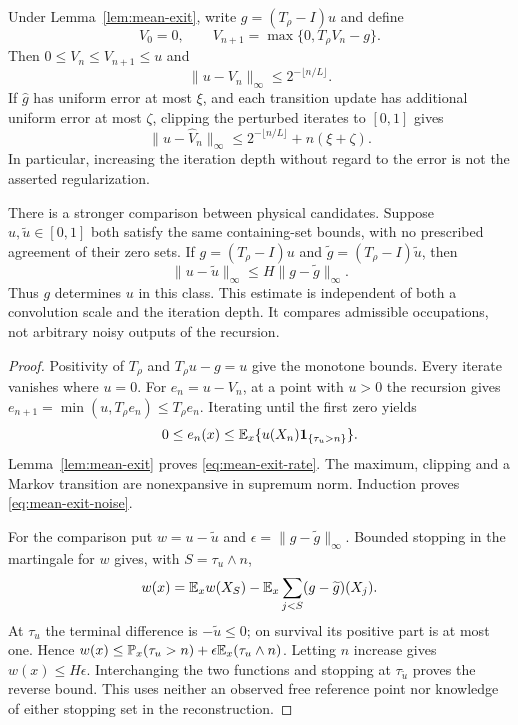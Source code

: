 \begin{theorem}
\label{thm:mean-exit-inverse}
Under Lemma~\ref{lem:mean-exit}, write $g=(T_\rho-I)u$ and define
\begin{equation}\label{eq:mean-exit-recursion}
 V_0=0,\qquad V_{n+1}=\max\{0,T_\rho V_n-g\}.
\end{equation}
Then $0\le V_n\le V_{n+1}\le u$ and
\begin{equation}\label{eq:mean-exit-rate}
 \|u-V_n\|_\infty\le2^{-\lfloor n/L\rfloor}.
\end{equation}
If $\widehat g$ has uniform error at most $\xi$, and each transition
update has additional uniform error at most $\zeta$, clipping the
perturbed iterates to $[0,1]$ gives
\begin{equation}\label{eq:mean-exit-noise}
 \|u-\widehat V_n\|_\infty
       \le2^{-\lfloor n/L\rfloor}+n(\xi+\zeta).
\end{equation}
In particular, increasing the iteration depth without regard to the
error is not the asserted regularization.

There is a stronger comparison between physical candidates. Suppose
$u,\widetilde u\in[0,1]$ both satisfy the same containing-set bounds,
with no prescribed agreement of their zero sets. If
$g=(T_\rho-I)u$ and $\widetilde g=(T_\rho-I)\widetilde u$, then
\begin{equation}\label{eq:unknown-support-stability}
 \|u-\widetilde u\|_\infty
                  \le H\|g-\widetilde g\|_\infty.
\end{equation}
Thus $g$ determines $u$ in this class. This estimate is independent of
both a convolution scale and the iteration depth. It compares admissible
occupations, not arbitrary noisy outputs of the recursion.
\end{theorem}
\begin{proof}
Positivity of $T_\rho$ and $T_\rho u-g=u$ give the monotone bounds.
Every iterate vanishes where $u=0$. For $e_n=u-V_n$, at a point with
$u>0$ the recursion gives $e_{n+1}=\min(u,T_\rho e_n)\le T_\rho e_n$.
Iterating until the first zero yields
\[
 0\le e_n(x)\le\mathbb E_x\{u(X_n)\mathbf 1_{\{\tau_u>n\}}\}.
\]
Lemma~\ref{lem:mean-exit} proves \eqref{eq:mean-exit-rate}.
The maximum, clipping and a Markov transition are nonexpansive in
supremum norm. Induction proves \eqref{eq:mean-exit-noise}.

For the comparison put $w=u-\widetilde u$ and
$\epsilon=\|g-\widetilde g\|_\infty$. Bounded stopping in the
martingale for $w$ gives, with $S=\tau_u\wedge n$,
\[
 w(x)=\mathbb E_x w(X_S)
       -\mathbb E_x\sum_{j<S}(g-\widetilde g)(X_j).
\]
At $\tau_u$ the terminal difference is $-\widetilde u\le0$; on
survival its positive part is at most one. Hence
$w(x)\le\mathbb P_x(\tau_u>n)+\epsilon\mathbb E_x(\tau_u\wedge n)$.
Letting $n$ increase gives $w(x)\le H\epsilon$. Interchanging the
two functions and stopping at $\tau_{\widetilde u}$ proves the reverse
bound. This uses neither an observed free reference point nor knowledge
of either stopping set in the reconstruction.
\end{proof}

